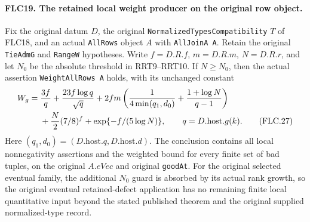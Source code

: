 \documentclass[11pt,a4paper]{article}
\numberwithin{equation}{section}
\theoremstyle{remark}\newtheorem{remark}[theorem]{Remark}
\begin{document}
\paragraph{FLC19. The retained local weight producer on the original row object.}
\label{claim:FLC19}
Fix the original datum $D$, the original
\texttt{Normalized\allowbreak Types\allowbreak Compatibility} $T$ of FLC18, and an
actual \texttt{All\allowbreak Rows} object $A$ with
\texttt{All\allowbreak Join\allowbreak A A}.  Retain the original
\texttt{Tie\allowbreak Adm\allowbreak G} and \texttt{Range\allowbreak W} hypotheses.
Write $f=D.R.f$, $m=D.R.m$, $N=D.R.r$, and let $N_0$ be the
absolute threshold in RRT9--RRT10.  If $N\ge N_0$, then the
actual assertion \texttt{Weight\allowbreak All\allowbreak Rows A} holds, with its
unchanged constant
\begin{align}
 W_g={}&\frac{3f}{q}+\frac{23f\log q}{\sqrt q}
       +2fm\left(\frac1{4\min(q_1,d_0)}
                     +\frac{1+\log N}{q-1}\right)\notag\\
     &+\frac N2(7/8)^f+\exp\{-f/(5\log N)\},
       \qquad q=D.\mathrm{host}.g(k).
 \tag{FLC.27}
\end{align}
Here $(q_1,d_0)=(D.\mathrm{host}.q,D.\mathrm{host}.d)$.
The conclusion contains all local nonnegativity assertions
and the weighted bound for every finite set of bad tuples,
on the original $A.eVec$ and original \texttt{good\allowbreak At}.
For the original selected eventual family, the additional
$N_0$ guard is absorbed by its actual rank growth, so the
original eventual retained-defect application has no
remaining finite local quantitative input beyond the stated
published theorem and the original supplied normalized-type
record.
\end{document}
